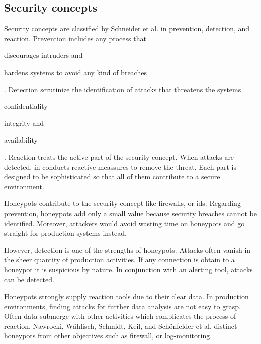 \subsection{Security concepts}
\label{subsec:honeypot-security-concept}

Security concepts are classified by Schneider et al. \cite{Schneier2004} in prevention, detection, and reaction. Prevention includes any process that
\begin{enumerate*}[label=(\roman*)]
    \item discourages intruders and
    \item hardens systems to avoid any kind of breaches
\end{enumerate*}. Detection scrutinize the identification of attacks that threatens the systems
\begin{enumerate*}[label=(\roman*)]
    \item confidentiality
    \item integrity and
    \item availability
\end{enumerate*}. Reaction treats the active part of the security concept. When attacks are detected, in conducts reactive meassures to remove the threat. Each part is designed to be sophisticated so that all of them contribute to a secure environment. \cite{NawrockiWSKS2016}

Honeypots contribute to the security concept like firewalls, or \ac{ids}. Regarding prevention, honeypots add only a small value because security breaches cannot be identified. Moreover, attackers would avoid wasting time on honeypots and go straight for production systems instead. 

However, detection is one of the strengths of honeypots. Attacks often vanish in the sheer quantity of production activities. If any connection is obtain to a honeypot it is suspicious by nature. In conjunction with an alerting tool, attacks can be detected. 

Honeypots strongly supply reaction tools due to their clear data. In production environments, finding attacks for further data analysis are not easy to grasp. Often data submerge with other activities which complicates the process of reaction. \cite{NawrockiWSKS2016} Nawrocki, Wählisch, Schmidt, Keil, and Schönfelder et al. \cite{NawrockiWSKS2016} distinct honeypots from other objectives such as firewall, or log-monitoring.

